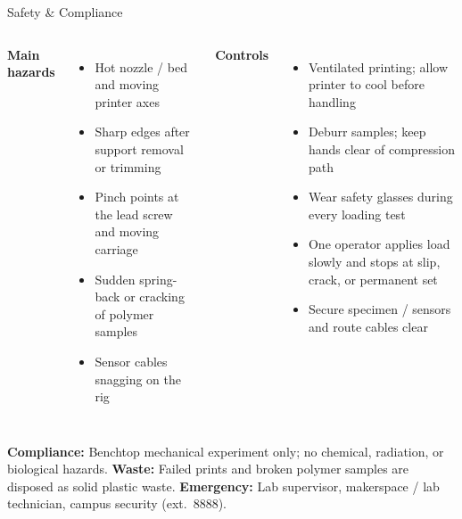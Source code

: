 
\begin{frame}{Safety \& Compliance}
  \footnotesize

  \begin{columns}[T,onlytextwidth]
    \textbf{Main hazards}
    \begin{itemize}\setlength\itemsep{2pt}
      \item Hot nozzle / bed and moving printer axes
      \item Sharp edges after support removal or trimming
      \item Pinch points at the lead screw and moving carriage
      \item Sudden spring-back or cracking of polymer samples
      \item Sensor cables snagging on the rig
    \end{itemize}

    \textbf{Controls}
    \begin{itemize}\setlength\itemsep{2pt}
      \item Ventilated printing; allow printer to cool before handling
      \item Deburr samples; keep hands clear of compression path
      \item Wear safety glasses during every loading test
      \item One operator applies load slowly and stops at slip,
            crack, or permanent set
      \item Secure specimen / sensors and route cables clear
    \end{itemize}
  \end{columns}

  {\scriptsize
    \textbf{Compliance:} Benchtop mechanical experiment only; no
    chemical, radiation, or biological hazards.
    \textbf{Waste:} Failed prints and broken polymer samples are
    disposed as solid plastic waste.
    \textbf{Emergency:} Lab supervisor, makerspace / lab technician,
    campus security (ext.\ 8888).}
\end{frame}
